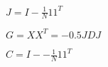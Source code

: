 \documentclass{article}
\begin{document}
$ J = I - \frac{1}{N}11^{T}$
\pagebreak

$G = XX^{T} = -0.5JDJ$
\pagebreak

$C = I - -\frac{1}{N}11^T$
\pagebreak
\end{document}
